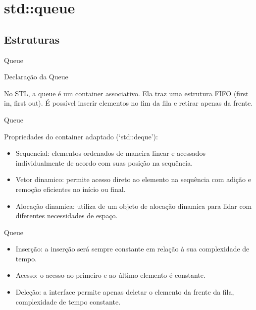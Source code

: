 \section{std::queue}

\subsection{Estruturas}

\begin{frame}[fragile]{Queue}

    \begin{block}{Declaração da Queue}
    \end{block}
	
    No STL, a queue é um container associativo. Ela traz uma estrutura FIFO (first in, first out). É possível inserir elementos no fim da fila e retirar apenas da frente.
    
\end{frame}

\begin{frame}[fragile]{Queue}


    Propriedades do container adaptado (`std::deque'):
    \begin{itemize}
        \item Sequencial: elementos ordenados de maneira linear e acessados individualmente de acordo com suas posição na sequência.
        \item Vetor dinamico: permite acesso direto ao elemento na sequência com adição e remoção eficientes no início ou final.
        \item Alocação dinamica: utiliza de um objeto de alocação dinamica para lidar com diferentes necessidades de espaço.
    \end{itemize}

\end{frame}

\begin{frame}[fragile]{Queue}

    \begin{itemize}
        \item Inserção: a inserção será sempre constante em relação à sua complexidade de tempo.
        \item Acesso: o acesso ao primeiro e ao último elemento é constante.
        \item Deleção: a interface permite apenas deletar o elemento da frente da fila, complexidade de tempo constante.
    \end{itemize}

\end{frame}

